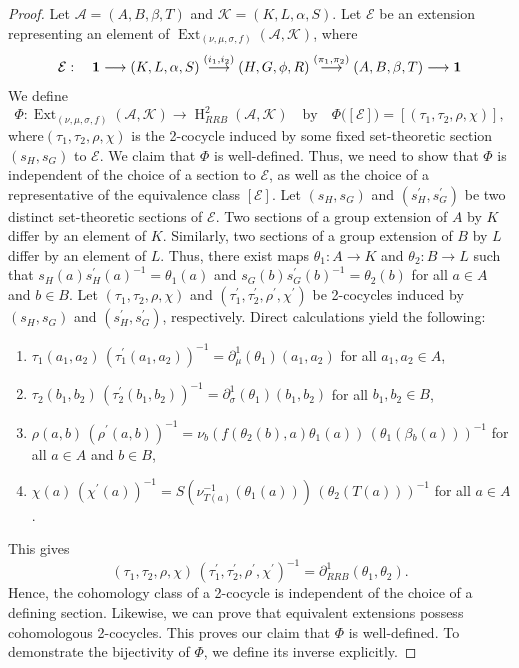 \documentclass[11pt]{amsart}
\theoremstyle{thrm}
\theoremstyle{plain}
\theoremstyle{definition}
\newcommand{\Ho}{\operatorname{H} }
\newcommand{\Ext}{\operatorname{Ext} }
\numberwithin{equation}{section}
\begin{document}
\begin{proof}
Let $\mathcal{A}= (A,B, \beta, T) $ and $\mathcal{K}=  (K,L,\alpha,S )$. Let $\mathcal{E}$ be an extension representing an element of  $\Ext_{(\nu, \mu, \sigma, f)}(\mathcal{A}, \mathcal{K})$, where
$$\mathcal{E} : \quad {\bf 1} \longrightarrow (K,L,\alpha,S ) \stackrel{(i_1, i_2)}{\longrightarrow}  (H,G, \phi, R) \stackrel{(\pi_1, \pi_2)}{\longrightarrow} (A,B, \beta, T) \longrightarrow {\bf 1}$$
We define
$$\Phi: \Ext_{(\nu, \mu, \sigma, f)}(\mathcal{A}, \mathcal{K}) \longrightarrow \Ho^2_{RRB}(\mathcal{A}, \mathcal{K}) \quad \textrm{by} \quad \Phi \big([\mathcal{E}]\big)= [(\tau_1, \tau_2, \rho, \chi )] ,$$
where$(\tau_1, \tau_2, \rho, \chi)$ is the 2-cocycle induced by some fixed  set-theoretic section $(s_H, s_G)$ to $\mathcal{E}$. We claim that $\Phi$ is well-defined. Thus, we need to show that $\Phi$ is independent of the choice of a section to $\mathcal{E}$, as well as the choice of a representative of the equivalence class $[\mathcal{E}]$.  Let $(s_H, s_G)$ and $(s_H^\prime,  s_G^\prime)$ be two distinct set-theoretic sections of  $\mathcal{E}$. Two sections of a group extension of  $A$ by $K$ differ by an element of  $K$. Similarly, two sections of a group extension of  $B$ by $L$ differ by an element of  $L$. Thus, there exist  maps $\theta_1: A \rightarrow K$ and $\theta_2: B \rightarrow L$ such that $s_H(a)s^\prime_H(a)^{-1}=\theta_1(a)$ and $s_G(b)s^\prime_G(b)^{-1}=\theta_2(b)$ for all $a \in A$ and $ b \in B$. Let $(\tau_1, \tau_2, \rho, \chi )$ and $(\tau^\prime_1, \tau^\prime_2, \rho^\prime, \chi^\prime )$ be 2-cocycles induced by $(s_H, s_G)$ and $(s_H^\prime,  s_G^\prime)$, respectively. Direct calculations yield the following:
\begin{enumerate}
\item  $\tau_1(a_1,a_2) \,(\tau^\prime_1(a_1, a_2))^{-1}=\partial^{1}_{\mu}(\theta_1)(a_1, a_2)$ for all $a_1, a_2 \in A$,
\item  $\tau_2(b_1, b_2) \,(\tau^\prime_2(b_1, b_2))^{-1}=\partial^{1}_{\sigma}(\theta_1)(b_1, b_2)$ for all $b_1, b_2 \in B$,
\item  $\rho(a, b) \,(\rho^\prime(a,b))^{-1}=\nu_b(f(\theta_2(b), a)\theta_1(a)) \,(\theta_1(\beta{_b(a)}))^{-1}$ for all $a \in A$ and $b \in B$,
\item $\chi(a) \,(\chi^\prime(a))^{-1} = S(\nu^{-1}_{T(a)}(\theta_1(a))) \,(\theta_2(T(a)))^{-1}$ for all $a \in A$.
\end{enumerate}
This gives $$(\tau_1, \tau_2, \rho, \chi ) \,(\tau^\prime_1, \tau^\prime_2, \rho^\prime, \chi^\prime )^{-1}=\partial^1_{RRB}(\theta_1, \theta_2).$$
Hence, the cohomology class of a 2-cocycle is independent of the choice of a defining section. Likewise, we can prove that equivalent extensions possess cohomologous 2-cocycles. This proves our claim that $\Phi$ is well-defined. To demonstrate the bijectivity of $\Phi$, we define its inverse explicitly. 


\end{proof}
\end{document}
